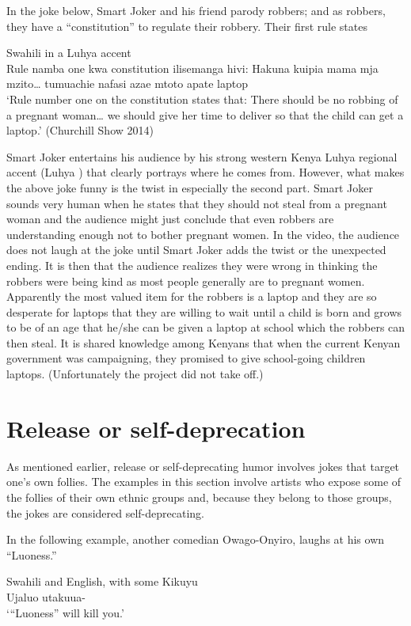 \documentclass[output=paper]{langsci/langscibook}
\begin{document}
In the joke below, Smart Joker and his friend parody robbers; and as robbers, they have a “constitution” to regulate their robbery. Their first rule states

\ea
{Swahili in a Luhya accent}\\
 Rule namba one kwa constitution ilisemanga hivi: Hakuna kuipia mama mja mzito… tumuachie nafasi azae mtoto apate laptop\\
\glt ‘Rule number one on the constitution states that: There should be no robbing of a pregnant woman… we should give her time to deliver so that the child can get a laptop.’ (Churchill Show 2014)
\z

Smart Joker entertains his audience by his strong western Kenya Luhya regional accent (Luhya ) that clearly portrays where he comes from. However, what makes the above joke funny is the twist in especially the second part. Smart Joker sounds very human when he states that they should not steal from a pregnant woman and the audience might just conclude that even robbers are understanding enough not to bother pregnant women. In the video, the audience does not laugh at the joke until Smart Joker adds the twist or the unexpected ending. It is then that the audience realizes they were wrong in thinking the robbers were being kind as most people generally are to pregnant women. Apparently the most valued item for the robbers is a laptop and they are so desperate for laptops that they are willing to wait until a child is born and grows to be of an age that he/she can be given a laptop at school which the robbers can then steal. It is shared knowledge among Kenyans that when the current Kenyan government was campaigning, they promised to give school-going children laptops. (Unfortunately the project did not take off.) 

\section{Release or self-deprecation}

   As mentioned earlier, release or self-deprecating humor involves jokes that target one’s own follies. The examples in this section involve artists who expose some of the follies of their own ethnic groups and, because they belong to those groups, the jokes are considered self-deprecating. 

In the following example, another comedian Owago-Onyiro, laughs at his own “Luoness.”

\ea
{Swahili and English, with some Kikuyu}\\
   Ujaluo utakuua-\\
\glt ‘“Luoness” will kill you.’
\z
\end{document}

